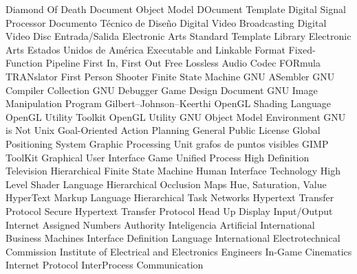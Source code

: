 {\begin{acronym}[XXXXXXXX]
    {Diamond Of Death}
    {Document Object Model} 
    {DOcument Template}
    {Digital Signal Processor}
    {Documento Técnico de Diseño}
    {Digital Video Broadcasting}
    {Digital Video Disc} 
    {Entrada/Salida} 
  {Electronic Arts Standard Template Library}
     {Electronic Arts}
   {Estados Unidos de América} 
    {Executable and Linkable Format}
    {Fixed-Function Pipeline}
   {First In, First Out} 
   {Free Lossless Audio Codec} 
 {FORmula TRANslator} 
    {First Person Shooter}
    {Finite State Machine}
    {\acs{GNU} ASembler}
    {\acs{GNU} Compiler Collection} 
    {\acs{GNU} Debugger} 
    {Game Design Document}
   {\acs{GNU} Image Manipulation Program}
    {Gilbert–Johnson–Keerthi}
   {OpenGL Shading Language}
   {OpenGL Utility Toolkit}
    {OpenGL Utility}
  {\acs{GNU} Object Model Environment}
    {\acs{GNU} is Not Unix} 
   {Goal-Oriented Action Planning}
    {General Public License} 
    {Global Positioning System}
    {Graphic Processing Unit}
    {grafos de puntos visibles}
    {\acs{GIMP} ToolKit}
    {Graphical User Interface} 
    {Game Unified Process}
   {High Definition Television}
   {Hierarchical Finite State Machine}
    {Human Interface Technology}
   {High Level Shader Language}
    {Hierarchical Occlusion Maps}
    {Hue, Saturation, Value}
   {HyperText Markup Language}
    {Hierarchical Task Networks}
  {Hypertext Transfer Protocol Secure}
   {Hypertext Transfer Protocol}
    {Head Up Display}
    {Input/Output} 
   {Internet Assigned Numbers Authority}
     {Inteligencia Artificial}
    {International Business Machines} 
    {Interface Definition Language}
    {International Electrotechnical Commission} 
   {Institute of Electrical and Electronics Engineers}
    {In-Game Cinematics}
     {Internet Protocol} 
    {InterProcess Communication}

\end{acronym}}
